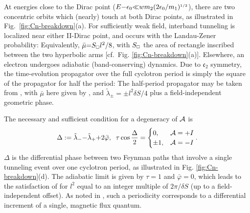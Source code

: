 \documentclass[aps, showpacs, twocolumn, notitlepage, superscriptaddress]{revtex4-1}
\begin{document}
At energies close to the Dirac point ($E{-}\epsilon_0 {\ll} wm_2(2\epsilon_0/m_1)^{\scriptscriptstyle{1/2}}$), there are two concentric orbits which (nearly) touch at both Dirac points, as illustrated in Fig.\ \ref{fig:Cn-breakdown}(a). For sufficiently weak field, interband tunneling is localized near either II-Dirac point, and occurs with the Landau-Zener probability:
Equivalently, $\bar{\mu}{=}S_{\scriptscriptstyle{\square}}l^2/8$, with $S_{\scriptscriptstyle{\square}}$ the area of rectangle inscribed between the two hyperbolic arms [cf.\  Fig. \ref{fig:Cn-breakdown}(a)]. Elsewhere, an electron undergoes adiabatic (band-conserving) dynamics. Due to $\mathfrak{c}_2$ symmetry, the time-evolution propagator over the full cyclotron period is simply the square of the propagator for half the period: 
The half-period propagator may be taken from , with  $\bar{\mu}$ here given by , and  $\tilde{\lambda}_{\pm}{=}{\pm}l^2\delta S/4$ plus a field-independent geometric phase.

The necessary and sufficient condition for a degeneracy of ${\cal A}$ is 
\begin{align}
\Delta:= \tilde{\lambda}_-{-}\tilde{\lambda}_{+}{+}2\bar{\varphi},\;\;
\tau\cos\frac{\Delta}{2}= \begin{cases} 0, & {{\cal A}}=+I \\
                 \pm 1, & {\cal A} =-I\end{cases}.\label{c2breakdowndgncondition}
\end{align}
$\Delta$ is the differential phase between two Feynman paths  that involve a single tunneling event  over one cyclotron period, as illustrated in Fig. \ref{fig:Cn-breakdown}(d).
The adiabatic limit is given by $\tau{=}1$ and $\bar{\varphi}{=}0$, which leads to the satisfaction of  for $l^2$ equal to an integer multiple of $2\pi/\delta S$ (up to a field-independent offset). As noted in , such a periodicity corresponds to a differential increment of a single, magnetic flux quantum. 
\end{document}

